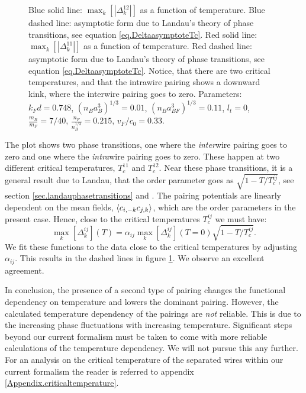 \begin{figure} 
\begin{center}  
  
\caption{Blue solid line: $\max_k[|\Delta^{12}_k|]$ as a function of temperature. Blue dashed line: asymptotic form due to Landau's theory of phase transitions, see equation \eqref{eq.DeltaasymptoteTc}. Red solid line: $\max_k[|\Delta^{11}_k|]$ as a function of temperature. Red dashed line: asymptotic form due to Landau's theory of phase transitions, see equation \eqref{eq.DeltaasymptoteTc}. Notice, that there are two critical temperatures, and that the intrawire pairing shows a downward kink, where the interwire pairing goes to zero. Parameters: $k_Fd = 0.748$, $(n_Ba_B^3)^{1/3} = 0.01$, $(n_Ba_{BF}^3)^{1/3} = 0.11$, $l_t = 0$, $\frac{m_B}{m_F} = 7/40$, $\frac{n_F}{n_B^{1/3}} = 0.215$, $v_F/c_0 = 0.33$.}  
\label{fig.maximalpairingsTdepend_2wires}  
\end{center}    
\end{figure}

The plot shows two phase transitions, one where the \textit{inter}wire pairing goes to zero and one where the \textit{intra}wire pairing goes to zero. These happen at two different critical temperatures, $T^{11}_{c}$ and $T^{12}_{c}$. Near these phase transitions, it is a general result due to Landau, that the order parameter goes as $\sqrt{1 - T/T^{ij}_c}$, see section \ref{sec.landauphasetransitions} and \cite[86-87]{PlischkeStatPhys}. The pairing potentials are linearly dependent on the mean fields, $\braket{c_{i, -k}c_{j,k}}$, which are the order parameters in the present case. Hence, close to the critical temperatures $T^{ij}_c$ we must have:
\begin{equation}
\max_k[\Delta^{ij}_k](T) = \alpha_{ij} \max_k[\Delta^{ij}_k](T = 0) \sqrt{1 - T/T^{ij}_c}. 
\label{eq.DeltaasymptoteTc}
\end{equation}
We fit these functions to the data close to the critical temperatures by adjusting $\alpha_{ij}$. This results in the dashed lines in figure \ref{fig.maximalpairingsTdepend_2wires}. We observe an excellent agreement. 

In conclusion, the presence of a second type of pairing changes the functional dependency on temperature and lowers the dominant pairing. However, the calculated temperature dependency of the pairings are \textit{not} reliable. This is due to the increasing phase fluctuations with increasing temperature. Significant steps beyond our current formalism must be taken to come with more reliable calculations of the temperature dependency. We will not pursue this any further. For an analysis on the critical temperature of the separated wires within our current formalism the reader is referred to appendix \ref{Appendix.criticaltemperature}. 

